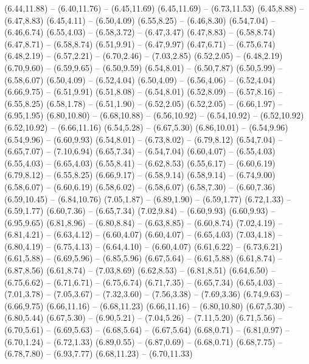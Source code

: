 {  (6.44,11.88) -- (6.40,11.76) -- (6.45,11.69)
  (6.45,11.69) -- (6.73,11.53)
  (6.45,8.88) -- (6.47,8.83)
  (6.45,4.11) -- (6.50,4.09)
  (6.55,8.25) -- (6.46,8.30)
  (6.54,7.04) -- (6.46,6.74)
  (6.55,4.03) -- (6.58,3.72) -- (6.47,3.47)
  (6.47,8.83) -- (6.58,8.74)
  (6.47,8.71) -- (6.58,8.74)
  (6.51,9.91) -- (6.47,9.97)
  (6.47,6.71) -- (6.75,6.74)
  (6.48,2.19) -- (6.57,2.21) -- (6.70,2.46) -- (7.03,2.85)
  (6.52,2.05) -- (6.48,2.19)
  (6.70,9.60) -- (6.59,9.65) -- (6.50,9.59)
  (6.54,8.01) -- (6.50,7.87)
  (6.50,5.99) -- (6.58,6.07)
  (6.50,4.09) -- (6.52,4.04)
  (6.50,4.09) -- (6.56,4.06) -- (6.52,4.04)
  (6.66,9.75) -- (6.51,9.91)
  (6.51,8.08) -- (6.54,8.01)
  (6.52,8.09) -- (6.57,8.16) -- (6.55,8.25)
  (6.58,1.78) -- (6.51,1.90) -- (6.52,2.05)
  (6.52,2.05) -- (6.66,1.97) -- (6.95,1.95)
  (6.80,10.80) -- (6.68,10.88) -- (6.56,10.92) -- (6.54,10.92) -- (6.52,10.92)
  (6.52,10.92) -- (6.66,11.16)
  (6.54,5.28) -- (6.67,5.30)
  (6.86,10.01) -- (6.54,9.96)
  (6.54,9.96) -- (6.60,9.93)
  (6.54,8.01) -- (6.73,8.02) -- (6.79,8.12)
  (6.54,7.04) -- (6.65,7.07) -- (7.10,6.94)
  (6.65,7.34) -- (6.54,7.04)
  (6.60,4.07) -- (6.55,4.03)
  (6.55,4.03) -- (6.65,4.03)
  (6.55,8.41) -- (6.62,8.53)
  (6.55,6.17) -- (6.60,6.19)
  (6.79,8.12) -- (6.55,8.25)
  (6.66,9.17) -- (6.58,9.14)
  (6.58,9.14) -- (6.74,9.00)
  (6.58,6.07) -- (6.60,6.19)
  (6.58,6.02) -- (6.58,6.07)
  (6.58,7.30) -- (6.60,7.36)
  (6.59,10.45) -- (6.84,10.76)
  (7.05,1.87) -- (6.89,1.90) -- (6.59,1.77)
  (6.72,1.33) -- (6.59,1.77)
  (6.60,7.36) -- (6.65,7.34)
  (7.02,9.84) -- (6.60,9.93)
  (6.60,9.93) -- (6.95,9.65)
  (6.81,8.96) -- (6.80,8.84) -- (6.63,8.85) -- (6.60,8.74)
  (7.02,4.19) -- (6.81,4.21) -- (6.63,4.12) -- (6.60,4.07)
  (6.60,4.07) -- (6.65,4.03)
  (7.03,4.18) -- (6.80,4.19) -- (6.75,4.13) -- (6.64,4.10) -- (6.60,4.07)
  (6.61,6.22) -- (6.73,6.21)
  (6.61,5.88) -- (6.69,5.96) -- (6.85,5.96)
  (6.67,5.64) -- (6.61,5.88)
  (6.61,8.74) -- (6.87,8.56)
  (6.61,8.74) -- (7.03,8.69)
  (6.62,8.53) -- (6.81,8.51)
  (6.64,6.50) -- (6.75,6.62) -- (6.71,6.71) -- (6.75,6.74)
  (6.71,7.35) -- (6.65,7.34)
  (6.65,4.03) -- (7.01,3.78) -- (7.05,3.67) -- (7.32,3.60) -- (7.56,3.38) -- (7.69,3.36)
  (6.74,9.63) -- (6.66,9.75)
  (6.66,11.16) -- (6.68,11.23)
  (6.66,11.16) -- (6.80,10.80)
  (6.67,5.30) -- (6.80,5.44)
  (6.67,5.30) -- (6.90,5.21) -- (7.04,5.26) -- (7.11,5.20)
  (6.71,5.56) -- (6.70,5.61) -- (6.69,5.63) -- (6.68,5.64) -- (6.67,5.64)
  (6.68,0.71) -- (6.81,0.97) -- (6.70,1.24) -- (6.72,1.33)
  (6.89,0.55) -- (6.87,0.69) -- (6.68,0.71)
  (6.68,7.75) -- (6.78,7.80) -- (6.93,7.77)
  (6.68,11.23) -- (6.70,11.33)
}
